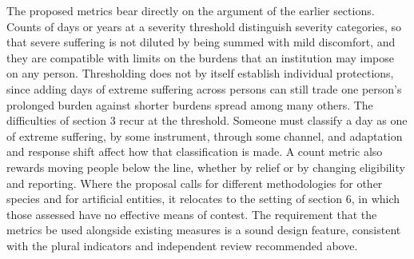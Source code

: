 \documentclass[11pt]{article}
\begin{document}
The proposed metrics bear directly on the argument of the earlier sections. Counts of days or years at a severity threshold distinguish severity categories, so that severe suffering is not diluted by being summed with mild discomfort, and they are compatible with limits on the burdens that an institution may impose on any person. Thresholding does not by itself establish individual protections, since adding days of extreme suffering across persons can still trade one person's prolonged burden against shorter burdens spread among many others. The difficulties of section 3 recur at the threshold. Someone must classify a day as one of extreme suffering, by some instrument, through some channel, and adaptation and response shift affect how that classification is made. A count metric also rewards moving people below the line, whether by relief or by changing eligibility and reporting. Where the proposal calls for different methodologies for other species and for artificial entities, it relocates to the setting of section 6, in which those assessed have no effective means of contest. The requirement that the metrics be used alongside existing measures is a sound design feature, consistent with the plural indicators and independent review recommended above.
\end{document}
